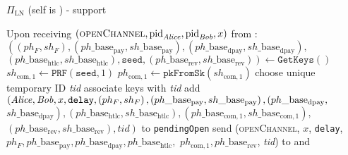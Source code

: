 \begin{protocolbox}{$\Pi_{\mathrm{LN}}$ (self is \alice) - support}
\begin{algorithmic}[1]
    \State Upon receiving $\left(\textsc{openChannel}, \mathrm{pid}_{\mathit{Alice}},
    \mathrm{pid}_{\mathit{Bob}}, x\right)$ from \environment:
    \Indent
      \State $\left(\left(ph_F, sh_F\right),
      \left(ph\_\mathrm{base}_{\mathrm{pay}},
      sh\_\mathrm{base}_{\mathrm{pay}}\right),
      \left(ph\_\mathrm{base}_{\mathrm{dpay}},
      sh\_\mathrm{base}_{\mathrm{dpay}}\right),\right.$
      $\left.\left(ph\_\mathrm{base}_{\mathrm{htlc}},
      sh\_\mathrm{base}_{\mathrm{htlc}}\right), \mathtt{seed},
      \left(ph\_\mathrm{base}_{\mathrm{rev}},
      sh\_\mathrm{base}_{\mathrm{rev}}\right)\right) \gets
      \texttt{GetKeys}\left(\right)$
      \State $sh_{\mathrm{com}, 1} \gets
      \texttt{PRF}\left(\mathtt{seed}, 1\right)$
      \State $ph_{\mathrm{com}, 1} \gets
      \mathtt{pkFromSk}\left(sh_{\mathrm{com}, 1}\right)$
      \State choose unique temporary ID \textit{tid} 
      \State associate keys with \textit{tid}
      \State add $\left(\mathit{Alice}, \mathit{Bob}, x, \mathtt{delay}, \left(ph_F,
      sh_F\right), \left(ph\_\mathrm{base}_{\mathrm{pay}},
      sh\_\mathrm{base}_{\mathrm{pay}}\right),
      \left(ph\_\mathrm{base}_{\mathrm{dpay}},\right.\right.$
      $\left.\left.sh\_\mathrm{base}_{\mathrm{dpay}}\right),
      \left(ph\_\mathrm{base}_{\mathrm{htlc}},
      sh\_\mathrm{base}_{\mathrm{htlc}}\right),
      \left(ph\_\mathrm{base}_{\mathrm{com}, 1},
      sh\_\mathrm{base}_{\mathrm{com}, 1}\right),\right.$
      $\left.\left(ph\_\mathrm{base}_{\mathrm{rev}},
      sh\_\mathrm{base}_{\mathrm{rev}}\right), \mathit{tid}\right)$ to
      \texttt{pendingOpen}
      \State send (\textsc{openChannel}, $x$, \texttt{delay}, $ph_F,
      ph\_\mathrm{base}_{\mathrm{pay}}, ph\_\mathrm{base}_{\mathrm{dpay}},
      ph\_\mathrm{base}_{\mathrm{htlc}},$ $ph_{\mathrm{com}, 1},
      ph\_\mathrm{base}_{\mathrm{rev}}$, \textit{tid}) to \bob{} and \adversary
    \EndIndent
    \State
  \end{algorithmic}
\end{protocolbox}

